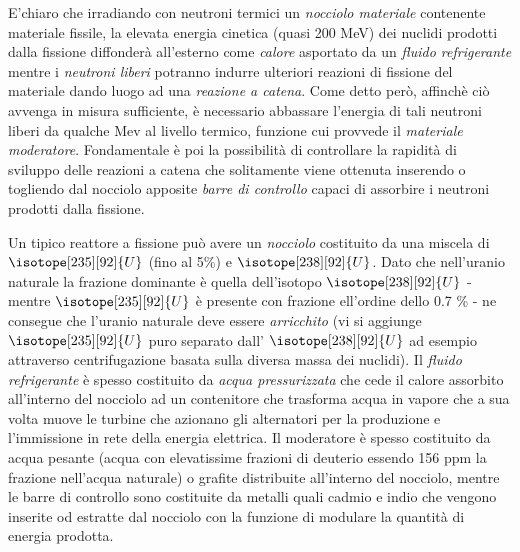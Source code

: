 E’chiaro che irradiando con neutroni termici un \emph{nocciolo materiale} contenente materiale fissile, la elevata
energia cinetica (quasi 200 MeV) dei nuclidi prodotti dalla fissione diffonderà all’esterno come \emph{calore} asportato
da un \emph{fluido refrigerante} mentre i \emph{neutroni liberi} potranno indurre ulteriori reazioni di fissione del
materiale dando luogo ad una \emph{reazione a catena}.
Come detto però, affinchè ciò avvenga in misura sufficiente, è necessario abbassare l’energia di tali neutroni liberi
da qualche Mev al livello termico, funzione cui provvede il \emph{materiale moderatore}.
Fondamentale è poi la possibilità di controllare la rapidità di sviluppo delle reazioni a catena che solitamente viene
ottenuta inserendo o togliendo dal nocciolo apposite \emph{barre di controllo} capaci di assorbire i neutroni prodotti
dalla fissione.

Un tipico reattore a fissione può avere un \emph{nocciolo} costituito da una miscela di $ \isotope[235][92]{\mathlarger{U}}$
(fino al 5\%) e $ \isotope[238][92]{\mathlarger{U}}$.
Dato che nell’uranio naturale la frazione dominante è quella dell’isotopo $ \isotope[238][92]{\mathlarger{U}}$ -
mentre $ \isotope[235][92]{\mathlarger{U}}$ è presente con frazione ell’ordine dello 0.7 \% - ne consegue che l’uranio
naturale deve essere \emph{arricchito} (vi si aggiunge $ \isotope[235][92]{\mathlarger{U}}$ puro separato dall’
$ \isotope[238][92]{\mathlarger{U}}$ ad esempio attraverso centrifugazione basata sulla diversa massa dei nuclidi).
Il \emph{fluido refrigerante} è spesso costituito da \emph{acqua pressurizzata} che cede il calore assorbito all’interno
del nocciolo ad un contenitore che trasforma acqua in vapore che a sua volta muove le turbine che azionano gli alternatori
per la produzione e l’immissione in rete della energia elettrica.
Il moderatore è spesso costituito da acqua pesante (acqua con elevatissime frazioni di deuterio essendo 156 ppm la
frazione nell’acqua naturale) o grafite distribuite all’interno del nocciolo, mentre le barre di controllo sono
costituite da metalli quali cadmio e indio che vengono inserite od estratte dal nocciolo con la funzione di modulare
la quantità di energia prodotta.
